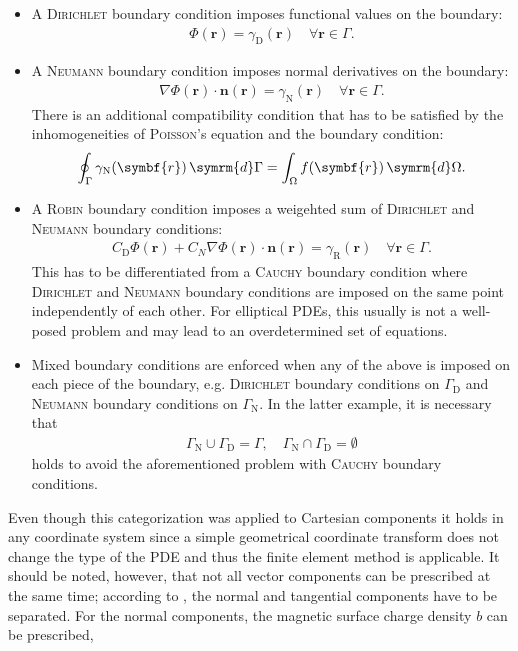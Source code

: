 \documentclass[a4paper, twoside, 10pt, english]{article}
\numberwithin{equation}{section}
\let\vec\symbf
\newcommand*\grad{\ensuremath{\nabla}}
\newcommand*\diff{\ensuremath{\symrm{d}}}  %
\begin{document}
\begin{itemize}
\item A \textsc{Dirichlet} boundary condition imposes functional values on the boundary:
  \begin{gather*}
    \Phi (\vec{r}) = \gamma_{\text{D}} (\vec{r}) \quad \forall \vec{r} \in \Gamma.
  \end{gather*}
\item A \textsc{Neumann} boundary condition imposes normal derivatives on the boundary:
  \begin{gather*}
    \grad \Phi (\vec{r}) \cdot \vec{n} (\vec{r}) = \gamma_{\text{N}} (\vec{r}) \quad \forall \vec{r} \in \Gamma.
  \end{gather*}
  There is an additional compatibility condition that has to be satisfied by the inhomogeneities of \textsc{Poisson}'s equation and the boundary condition:
  \begin{gather*}
    \oint_{\Gamma} \gamma_{\text{N}} (\vec{r}) \, \diff \Gamma = \int_{\Omega} f (\vec{r}) \, \diff \Omega.
  \end{gather*}
\item A \textsc{Robin} boundary condition imposes a weigehted sum of \textsc{Dirichlet} and \textsc{Neumann} boundary conditions:
  \begin{gather*}
    C_{\text{D}} \Phi (\vec{r}) + C_{N} \grad \Phi (\vec{r}) \cdot \vec{n} (\vec{r}) = \gamma_{\text{R}} (\vec{r}) \quad \forall \vec{r} \in \Gamma.
  \end{gather*}
  This has to be differentiated from a \textsc{Cauchy} boundary condition where \textsc{Dirichlet} and \textsc{Neumann} boundary conditions are imposed on the same point independently of each other. For elliptical PDEs, this usually is not a well-posed problem and may lead to an overdetermined set of equations.
\item Mixed boundary conditions are enforced when any of the above is imposed on each piece of the boundary, e.g. \textsc{Dirichlet} boundary conditions on $\Gamma_{\text{D}}$ and \textsc{Neumann} boundary conditions on $\Gamma_{\text{N}}$. In the latter example, it is necessary that
  \begin{gather*}
    \Gamma_{\text{N}} \cup \Gamma_{\text{D}} = \Gamma, \quad \Gamma_{\text{N}} \cap \Gamma_{\text{D}} = \emptyset
  \end{gather*}
  holds to avoid the aforementioned problem with \textsc{Cauchy} boundary conditions.
\end{itemize}
Even though this categorization was applied to Cartesian components it holds in any coordinate system since a simple geometrical coordinate transform does not change the type of the PDE and thus the finite element method is applicable. It should be noted, however, that not all vector components can be prescribed at the same time; according to \cite{Biro15}, the normal and tangential components have to be separated. For the normal components, the magnetic surface charge density $b$ can be prescribed,
\end{document}
